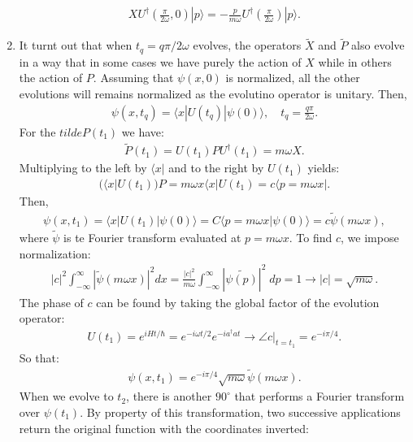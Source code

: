 \documentclass[letterpaper,11pt,twoside]{article}
\newcommand{\ket}[1]{|#1\rangle}
\newcommand{\bra}[1]{\langle#1|}
\newcommand{\braket}[1]{\langle#1\rangle}
\begin{document}
\begin{enumerate}[itemsep=0pt,topsep=0pt,label=\alph*)]
  \begin{align*}
    XU^\dagger(\frac{\pi}{2\omega},0)\ket{p}=-\frac{p}{m\omega}U^\dagger(\frac{\pi}{2\omega})\ket{p}.
  \end{align*}
  \item It turnt out that when $t_q=q\pi/2\omega$ evolves, the operators $\tilde{X}$ and $\tilde{P}$ also evolve in a way that in some cases we have purely the action of $X$ 
  while in others the action of $P$. Assuming that $\psi(x,0)$ is normalized, all the other evolutions will remains normalized as the evolutino operator is unitary.
  Then,
  \begin{align*}
    \psi(x,t_q)=\braket{x|U(t_q)|\psi(0)},\quad t_q=\frac{q\pi}{2\omega}.
  \end{align*}
  For the $tilde{P}(t_1)$ we have:
  \begin{align*}
    \tilde{P}(t_1)=U(t_1)PU^\dagger(t_1)=m\omega X.
  \end{align*}
  Multiplying to the left by $\bra{x}$ and to the right by $U(t_1)$ yields:
  \begin{align*}
    (\bra{x}U(t_1))P=m\omega x\bra{x}U(t_1)=c\bra{p=m\omega x}.
  \end{align*}
  Then,
  \begin{align*}
    \psi(x,t_1)=\braket{x|U(t_1)|\psi(0)}=C\braket{p=m\omega x|\psi(0)}=c\tilde{\psi}(m\omega x),
  \end{align*}
  where $\tilde{\psi}$ is te Fourier transform evaluated at $p=m\omega x$. To find $c$, we impose normalization:
  \begin{align*}
    |c|^2\int_{-\infty}^\infty|\tilde{\psi}(m\omega x)|^2dx=\frac{|c|^2}{m\omega}\int_{-\infty}^\infty|\tilde{\psi(p)}|^2\;dp=1\longrightarrow|c|=\sqrt{m\omega}.
  \end{align*}
  The phase of $c$ can be found by taking the global factor of the evolution operator:
  \begin{align*}
    U(t_1)=e^{iHt/\hbar}=e^{-i\omega t/2}e^{-ia^\dagger a t}\longrightarrow \angle c|_{t=t_1}=e^{-i\pi/4}.
  \end{align*}
  So that:
  \begin{align*}
    \psi(x,t_1)=e^{-i\pi/4}\sqrt{m\omega}\tilde{\psi}(m\omega x).
  \end{align*}
  When we evolve to $t_2$, there is another $90^\circ$ that performs a Fourier transform over $\psi(t_1)$. By property of this transformation, two successive applications return
  the original function with the coordinates inverted:
  \begin{align*}

\end{align*}
\end{enumerate}
\end{document}
